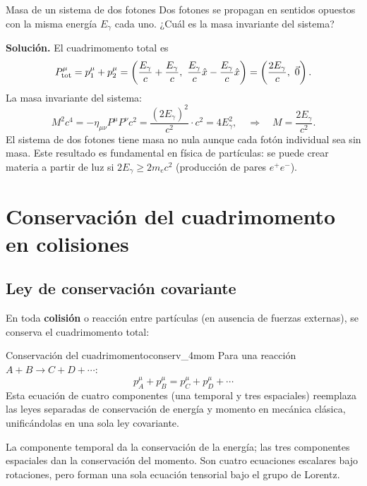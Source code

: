 \begin{ejemplo}{Masa de un sistema de dos fotones}{}
Dos fotones se propagan en sentidos opuestos con la misma energía $E_\gamma$ cada uno. ¿Cuál es la masa invariante del sistema?

\textbf{Solución.} El cuadrimomento total es
\[
  P^\mu_{\rm tot} = p^\mu_1 + p^\mu_2 = \left(\frac{E_\gamma}{c} + \frac{E_\gamma}{c},\ \frac{E_\gamma}{c}\hat{x} - \frac{E_\gamma}{c}\hat{x}\right)
  = \left(\frac{2E_\gamma}{c},\ \vec{0}\right).
\]
La masa invariante del sistema:
\[
  M^2 c^4 = -\eta_{\mu\nu}P^\mu P^\nu c^2 = \frac{(2E_\gamma)^2}{c^2}\cdot c^2 = 4E_\gamma^2,
  \quad \Rightarrow \quad M = \frac{2E_\gamma}{c^2}.
\]
El sistema de dos fotones tiene masa no nula aunque cada fotón individual sea sin masa. Este resultado es fundamental en física de partículas: se puede crear materia a partir de luz si $2E_\gamma \geq 2m_e c^2$ (producción de pares $e^+e^-$).
\end{ejemplo}

\section{Conservación del cuadrimomento en colisiones}

\subsection{Ley de conservación covariante}

En toda \textbf{colisión} o reacción entre partículas (en ausencia de fuerzas externas), se conserva el cuadrimomento total:

\begin{teorema}{Conservación del cuadrimomento}{conserv_4mom}
Para una reacción $A + B \to C + D + \cdots$:
\begin{equation}
  p^\mu_A + p^\mu_B = p^\mu_C + p^\mu_D + \cdots
  \label{eq:conserv_4mom}
\end{equation}
Esta ecuación de cuatro componentes (una temporal y tres espaciales) reemplaza las leyes separadas de conservación de energía y momento en mecánica clásica, unificándolas en una sola ley covariante.
\end{teorema}

La componente temporal da la conservación de la energía; las tres componentes espaciales dan la conservación del momento. Son cuatro ecuaciones escalares bajo rotaciones, pero forman una sola ecuación tensorial bajo el grupo de Lorentz.


